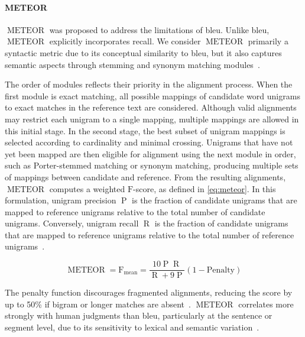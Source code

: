 
\paragraph{METEOR}
$\operatorname{METEOR}$ was proposed to address the limitations of \ac{bleu}. 
Unlike \ac{bleu}, $\operatorname{METEOR}$ explicitly incorporates recall. 
We consider $\operatorname{METEOR}$ primarily a syntactic metric due to its conceptual similarity to \ac{bleu}, but it also captures semantic aspects through stemming and synonym matching modules~\citep{kurt_pehlivanoglu_comparative_2024}. 

The order of modules reflects their priority in the alignment process. 
When the first module is exact matching, all possible mappings of candidate word unigrams to exact matches in the reference text are considered. 
Although valid alignments may restrict each unigram to a single mapping, multiple mappings are allowed in this initial stage. 
In the second stage, the best subset of unigram mappings is selected according to cardinality and minimal crossing. 
Unigrams that have not yet been mapped are then eligible for alignment using the next module in order, such as Porter-stemmed matching or synonym matching, producing multiple sets of mappings between candidate and reference. 
From the resulting alignments, $\operatorname{METEOR}$ computes a weighted $\mathrm{F}$-score, as defined in \autoref{eq:meteor}. 
In this formulation, unigram precision $\operatorname{P}$ is the fraction of candidate unigrams that are mapped to reference unigrams relative to the total number of candidate unigrams. 
Conversely, unigram recall $\operatorname{R}$ is the fraction of candidate unigrams that are mapped to reference unigrams relative to the total number of reference unigrams~\citep{banerjee_METEOR_2005}.

\begin{equation}
    \operatorname{METEOR} = \operatorname{F_{mean}} = \frac{10  \operatorname{P}  \operatorname{R}}{\operatorname{R} + 9  \operatorname{P}}  (1 - \mathrm{Penalty})
\label{eq:meteor}
\end{equation}

The penalty function discourages fragmented alignments, reducing the score by up to 50\% if bigram or longer matches are absent~\citep{banerjee_METEOR_2005}. 
$\operatorname{METEOR}$ correlates more strongly with human judgments than \ac{bleu}, particularly at the sentence or segment level, due to its sensitivity to lexical and semantic variation~\citep{zhou_paraphrase_2021,kurt_pehlivanoglu_comparative_2024}.


